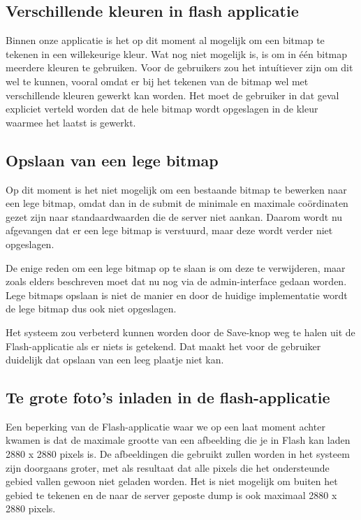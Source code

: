 \subsection{Verschillende kleuren in flash applicatie} %
Binnen onze applicatie is het op dit moment al mogelijk om een bitmap te tekenen in een willekeurige kleur. 
Wat nog niet mogelijk is, is om in \'{e}\'{e}n bitmap meerdere kleuren te gebruiken.
Voor de gebruikers zou het intu\'{i}tiever zijn om dit wel te kunnen, vooral omdat er bij het tekenen van de bitmap wel met verschillende kleuren gewerkt kan worden.
Het moet de gebruiker in dat geval expliciet verteld worden dat de hele bitmap wordt opgeslagen in de kleur waarmee het laatst is gewerkt.


\subsection{Opslaan van een lege bitmap} %
Op dit moment is het niet mogelijk om een bestaande bitmap te bewerken naar een lege bitmap, omdat dan in de submit de minimale en maximale co\"ordinaten gezet zijn naar standaardwaarden die de server niet aankan. Daarom wordt nu afgevangen dat er een lege bitmap is verstuurd, maar deze wordt verder niet opgeslagen.

De enige reden om een lege bitmap op te slaan is om deze te verwijderen, maar zoals elders beschreven moet dat nu nog via de admin-interface gedaan worden. Lege bitmaps opslaan is niet de manier en door de huidige implementatie wordt de lege bitmap dus ook niet opgeslagen.

Het systeem zou verbeterd kunnen worden door de Save-knop weg te halen uit de Flash-applicatie als er niets is getekend. Dat maakt het voor de gebruiker duidelijk dat opslaan van een leeg plaatje niet kan.

\subsection{Te grote foto's inladen in de flash-applicatie} %
Een beperking van de Flash-applicatie waar we op een laat moment achter kwamen is dat de maximale grootte van een afbeelding die je in Flash kan laden 2880 x 2880 pixels is. De afbeeldingen die gebruikt zullen worden in het systeem zijn doorgaans groter, met als resultaat dat alle pixels die het ondersteunde gebied vallen gewoon niet geladen worden. Het is niet mogelijk om buiten het gebied te tekenen en de naar de server geposte dump is ook maximaal 2880 x 2880 pixels.

